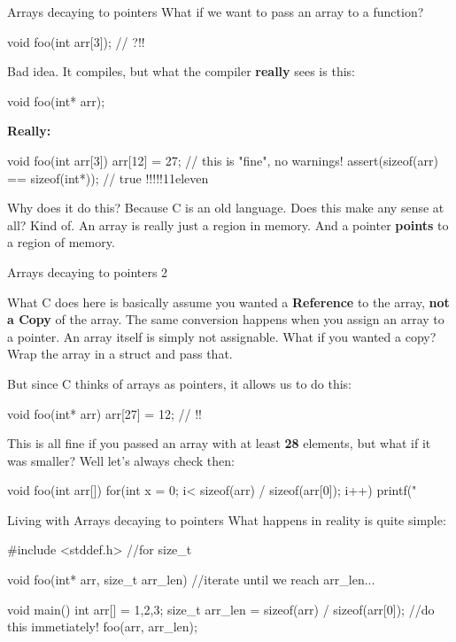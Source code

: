 \documentclass[10pt,graphics,aspectratio=169,table]{beamer}
\begin{document}
\begin{frame}[fragile]{Arrays decaying to pointers}
    What if we want to pass an array to a function?
    \begin{codeblock}
void foo(int arr[3]); // ?!!
    \end{codeblock}

    Bad idea. It compiles, but what the compiler \textbf{really} sees is this:
    \begin{codeblock}
void foo(int* arr);
    \end{codeblock} 

    \textbf{Really:}
    \begin{codeblock}
void foo(int arr[3]){
    arr[12] = 27; // this is "fine", no warnings!
    assert(sizeof(arr) == sizeof(int*)); // true !!!!!11eleven
}
    \end{codeblock} 

    Why does it do this? Because C is an old language.
    Does this make any sense at all? Kind of. 
    An array is really just a region in memory. And a pointer 
    \textbf{points} to a region of memory.
 
\end{frame}

\begin{frame}[fragile]{Arrays decaying to pointers 2}
   
    
    What C does here is basically assume you wanted a \textbf{Reference} to 
    the array,  \textbf{not a Copy} of the array. The same conversion happens
    when you assign an array to a pointer. An array itself is simply not
    assignable. What if you wanted a copy? 
    Wrap the array in a struct and pass that. 

    But since C thinks of arrays as pointers, it allows us to do this:
    \begin{codeblock}
void foo(int* arr){
    arr[27] = 12; // !!
}
    \end{codeblock} 

    This is all fine if you passed an array with at least \textbf{28}
    elements, but what if it was smaller? Well let's always check then:
\begin{codeblock}
void foo(int arr[]){ 
   for(int x = 0; i< sizeof(arr) / sizeof(arr[0]); i++){
       printf("%
   }
}
\end{codeblock} 
\end{frame}

\begin{frame}[fragile]{Living with Arrays decaying to pointers}
What happens in reality is quite simple:
\begin{codeblock} 
#include <stddef.h> //for size_t

void foo(int* arr, size_t arr_len){ 
    //iterate until we reach arr_len...
}

void main(){
    int arr[] = {1,2,3};
    size_t arr_len = sizeof(arr) / sizeof(arr[0]); //do this immetiately!
    foo(arr, arr_len);
}
\end{codeblock} 
\end{frame}
\end{document}
